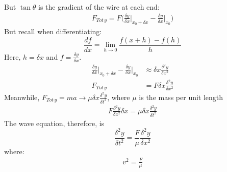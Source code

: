\documentclass[a4paper, 11pt, normalem]{report}
\begin{document}
But $\tan{\theta}$ is the gradient of the wire at each end:
\begin{align}
    F_{Tot\,y} = F\Big(\frac{{\delta}y}{{\delta}x}\Big|_{x_{0} + {\delta}x} - \frac{{\delta}y}{{\delta}x}\Big|_{x_{0}}\Big)
\end{align}
But recall when differentiating:
\begin{equation}
    \frac{df}{dx} = \lim_{h\to0} \frac{f(x+h) - f(h)}{h}
\end{equation}
Here, $h = {\delta}x$ and $f = \frac{{\delta}y}{{\delta}x}$.
\begin{align}
    \frac{{\delta}y}{{\delta}x}\Big|_{x_{0} + {\delta}x} - \frac{{\delta}y}{{\delta}x}\Big|_{x_{0}} &\approx \delta x \frac{\delta^{2}y}{\delta x^{2}} \\
    F_{Tot\,y} &= F\delta x\frac{\delta^{2}y}{\delta x^{2}}
\end{align}
Meanwhile, $F_{Tot\,y} = ma \rightarrow \mu\delta x \frac{\delta^{2}y}{\delta t^{2}}$, where $\mu$ is the mass per unit length
\begin{align}
    F\frac{\delta^{2}y}{\delta x^{2}} \delta x = \mu\delta x\frac{\delta^{2}y}{\delta t^{2}}
\end{align}
The wave equation, therefore, is
\begin{equation}
    \frac{\delta^{2}y}{\delta t^{2}} = \frac{F}{\mu}\frac{\delta^{2}y}{\delta x^{2}}
\end{equation}
where:
\begin{align}
    v^{2} = \frac{F}{\mu}
\end{align}
\end{document}
